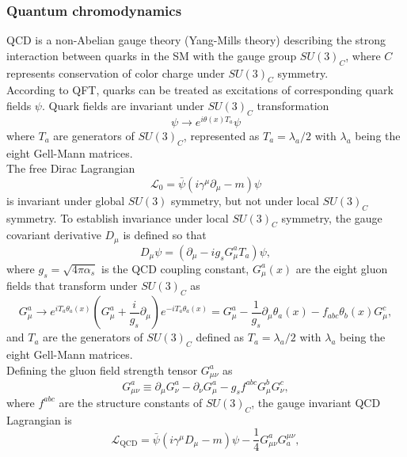\documentclass[../thesis.tex]{subfiles}
\begin{document}
\subsubsection{Quantum chromodynamics}
\acs{QCD} is a non-Abelian gauge theory (Yang-Mills theory) describing the strong interaction between quarks in the \acs{SM} with the gauge group $SU(3)_C$, where $C$ represents conservation of color charge under $SU(3)_C$ symmetry.\\
According to QFT, quarks can be treated as excitations of corresponding quark fields $\psi$.
Quark fields are invariant under $SU(3)_C$ transformation
\begin{equation}
\psi \rightarrow e^{i\theta(x)T_a} \psi
\end{equation}
where $T_a$ are generators of $SU(3)_C$, represented as $T_a=\lambda_a/2$ with $\lambda_a$ being the eight Gell-Mann matrices.\\
The free Dirac Lagrangian
\begin{equation}
\mathcal{L}_0=\bar{\psi}(i\gamma^\mu\partial_\mu-m)\psi
\end{equation}
is invariant under global $SU(3)$ symmetry, but not under local $SU(3)_C$ symmetry.
To establish invariance under local $SU(3)_C$ symmetry, the gauge covariant derivative $D_\mu$ is defined so that
\begin{equation}
D_\mu \psi = (\partial_\mu-ig_sG^a_\mu T_a)\psi,
\end{equation}
where $g_s=\sqrt{4\pi\alpha_s}$ is the \acs{QCD} coupling constant, $G^a_\mu(x)$ are the eight gluon fields that transform under $SU(3)_C$ as
\begin{equation}
G_\mu^a \rightarrow e^{iT_a\theta_a(x)}\left( G_\mu^a+\frac{i}{g_s}\partial_\mu \right)e^{-iT_a\theta_a(x)}
=G_\mu^a - \frac{1}{g_s}\partial_\mu\theta_a(x)-f_{abc}\theta_b(x)G_\mu^c,
\end{equation} 
and $T_a$ are the generators of $SU(3)_C$ defined as $T_a=\lambda_a/2$ with $\lambda_a$ being the eight Gell-Mann matrices.\\
Defining the gluon field strength tensor $G^a_{\mu \nu}$ as
\begin{equation}
G_{\mu \nu}^a \equiv \partial_\mu G^a_\nu - \partial_\nu G^a_\mu - g_s f^{abc} G^b_\mu G^c_\nu,
\end{equation}
where $f^{abc}$ are the structure constants of $SU(3)_C$, the gauge invariant \acs{QCD} Lagrangian is
\begin{equation}
\mathcal{L}_\text{QCD}=\bar{\psi}(i\gamma^\mu D_\mu-m)\psi - \frac{1}{4} G_{\mu \nu}^a G_a^{\mu \nu},
\end{equation}
\end{document}
